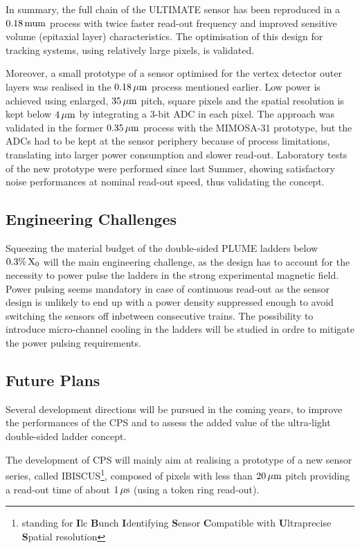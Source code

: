 In summary, the full chain of the ULTIMATE sensor has been reproduced
in a $\unit[0.18]{mu m}$ process with twice faster read-out frequency and
improved sensitive volume (epitaxial layer) characteristics. The
optimisation of this design for tracking systems, using relatively
large pixels, is validated.

Moreover, a small prototype of a sensor optimised for the vertex detector
outer layers was realised in the $\unit[0.18]{\mu m}$ process mentioned earlier.
Low power is achieved using enlarged, $\unit[35]{\mu m}$ pitch, square pixels and the
spatial resolution is kept below $\unit[4]{\mu m}$ by integrating a 3-bit ADC in
each pixel. The approach was validated in the former $\unit[0.35]{\mu m}$ process
with the MIMOSA-31 prototype, but the ADCs had to be kept at the sensor
periphery because of process limitations, translating into larger
power consumption and slower read-out. Laboratory tests of the new
prototype were performed since last Summer, showing satisfactory noise performances at nominal read-out speed, thus validating the concept.


\subsection{Engineering Challenges}
Squeezing the material budget of the double-sided PLUME ladders
below $\unit[0.3\%]{X_0}$ will the main engineering challenge, as the design
has to account for the necessity to power pulse the ladders in the
strong experimental magnetic field. Power pulsing seems mandatory
in case of continuous read-out as the sensor design is unlikely to
end up with a power density suppressed enough to avoid switching
the sensors off inbetween consecutive trains. The possibility to
introduce micro-channel cooling in the ladders will be studied in
ordre to mitigate the power pulsing requirements.

\subsection{Future Plans}

Several development directions will be pursued in the coming years,
to improve the performances of the CPS and to assess the added value
of the ultra-light double-sided ladder concept.

The development of CPS will mainly aim at realising a prototype of
a new sensor series, called IBISCUS\footnote{standing for {\bf I}lc
{\bf B}unch {\bf I}dentifying {\bf S}ensor {\bf C}ompatible with
{\bf U}ltraprecise {\bf S}patial resolution},
composed of pixels with less than $\unit[20]{\mu m}$ pitch providing a
read-out time of about $\unit[1]{\mu s}$ (using a token ring read-out).

